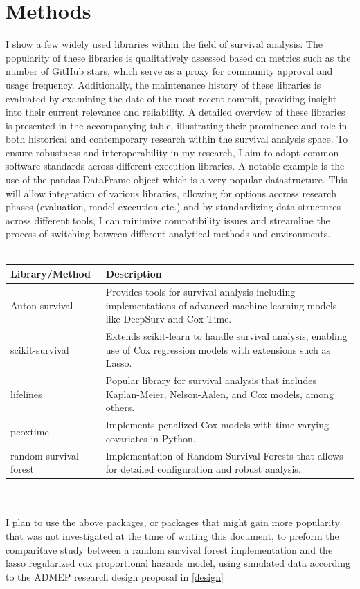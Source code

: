 \section{Methods} \label{methods}
I show a few widely used libraries within the field of survival analysis. The popularity of these libraries is qualitatively assessed based on metrics such as the number of GitHub stars, which serve as a proxy for community approval and usage frequency. Additionally, the maintenance history of these libraries is evaluated by examining the date of the most recent commit, providing insight into their current relevance and reliability. A detailed overview of these libraries is presented in the accompanying table, illustrating their prominence and role in both historical and contemporary research within the survival analysis space. To ensure robustness and interoperability in my research, I aim to adopt common software standards across different execution libraries. A notable example is the use of the pandas DataFrame object which is a very popular datastructure. This will allow integration of various libraries, allowing for options accross research phases (evaluation, model execution etc.) and by standardizing data structures across different tools, I can minimize compatibility issues and streamline the process of switching between different analytical methods and environments.
\\\\
\noindent \begin{tabularx}{\textwidth}{|X|X|}
\hline
Library/Method & Description \\
\hline
Auton-survival \parencite{nagpal_auton-survival_2022} & Provides tools for survival analysis including implementations of advanced machine learning models like DeepSurv and Cox-Time. \\
\hline
scikit-survival \parencite{sebastian_polsterl_scikit-survival_2023} & Extends scikit-learn \parencite{scikit-learn} to handle survival analysis, enabling use of Cox regression models with extensions such as Lasso. \\
\hline
lifelines \parencite{davidson-pilon_lifelines_2024} & Popular library for survival analysis that includes Kaplan-Meier, Nelson-Aalen, and Cox models, among others. \\
\hline
pcoxtime \parencite{cygu_pcoxtime_2021} & Implements penalized Cox models with time-varying covariates in Python. \\
\hline
random-survival-forest \parencite{spath_julianspaethrandom-survival-forest_2021} & Implementation of Random Survival Forests that allows for detailed configuration and robust analysis. \\
\hline
\end{tabularx}
\\\\
\noindent I plan to use the above packages, or packages that might gain more popularity that was not investigated at the time of writing this document, to preform the comparitave study between a random survival forest implementation and the lasso regularized cox proportional hazards model, using simulated data according to the ADMEP research design proposal in \ref{design}

